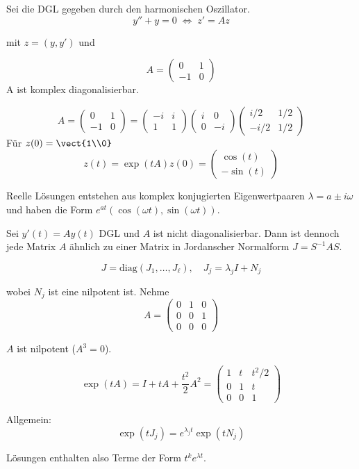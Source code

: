 \documentclass[11pt, a4paper]{article}
\begin{document}
\begin{example} Sei die DGL gegeben durch den harmonischen Oszillator.
\[
y'' + y = 0 \;\Longleftrightarrow\; z' = Az
\]

mit $z=(y,y')$ und

\[
A=
\begin{pmatrix}
0 & 1 \\
-1 & 0
\end{pmatrix}
\]
A ist komplex diagonalisierbar.

$$A=\begin{pmatrix}
0 & 1 \\
-1 & 0
\end{pmatrix}
 =\begin{pmatrix}
-i & i \\
1 & 1
\end{pmatrix} \begin{pmatrix}
i & 0 \\
0 & -i
\end{pmatrix} \begin{pmatrix}
i/2 & 1/2 \\
-i/2 & 1/2
\end{pmatrix}$$
Für $z(0) = \vect{1\\0}$
\[
z(t) = \exp(tA)z(0)
=
\begin{pmatrix}
\cos(t) \\
-\sin(t)
\end{pmatrix}
\]

Reelle Lösungen entstehen aus komplex konjugierten Eigenwertpaaren
$\lambda=a\pm i\omega$ und haben die Form
$e^{at}(\cos(\omega t), \sin(\omega t))$.
\end{example} 

\begin{example} Sei $y'(t)=Ay(t)$ DGL und $A$ ist nicht diagonalisierbar. Dann ist dennoch jede Matrix $A$ ähnlich zu einer Matrix in Jordanscher Normalform
$J=S^{-1}AS$.

\[
J=\mathrm{diag}(J_1,\dots,J_\ell), \quad J_j=\lambda_j I + N_j
\]

wobei $N_j$ ist eine nilpotent ist. Nehme
\[
A=
\begin{pmatrix}
0 & 1 & 0 \\
0 & 0 & 1 \\
0 & 0 & 0
\end{pmatrix}
\]

$A$ ist nilpotent ($A^3=0$).

\[
\exp(tA) = I + tA + \frac{t^2}{2}A^2
=
\begin{pmatrix}
1 & t & t^2/2 \\
0 & 1 & t \\
0 & 0 & 1
\end{pmatrix}
\]

Allgemein:
\[
\exp(tJ_j)=e^{\lambda_j t}\exp(tN_j)
\]

Lösungen enthalten also Terme der Form $t^k e^{\lambda t}$.
\end{example}
\end{document}
